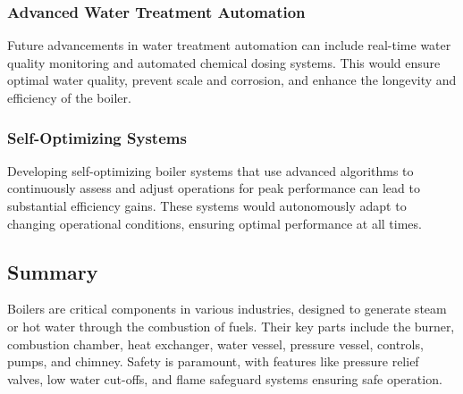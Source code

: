 \subsubsection{Advanced Water Treatment Automation}

Future advancements in water treatment automation can include real-time water quality monitoring and automated chemical dosing systems. This would ensure optimal water quality, prevent scale and corrosion, and enhance the longevity and efficiency of the boiler.

\subsubsection{Self-Optimizing Systems}

Developing self-optimizing boiler systems that use advanced algorithms to continuously assess and adjust operations for peak performance can lead to substantial efficiency gains. These systems would autonomously adapt to changing operational conditions, ensuring optimal performance at all times.

\subsection{Summary}
Boilers are critical components in various industries, designed to generate steam or hot water through the combustion of fuels. Their key parts include the burner, combustion chamber, heat exchanger, water vessel, pressure vessel, controls, pumps, and chimney. Safety is paramount, with features like pressure relief valves, low water cut-offs, and flame safeguard systems ensuring safe operation.
